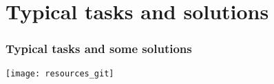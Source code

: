 \section{Typical tasks and solutions}


\begin{frame}
  \frametitle{Typical tasks and some solutions}

  \hspace{0.\hsize}\texttt{[image: resources\_git]}

\end{frame}
